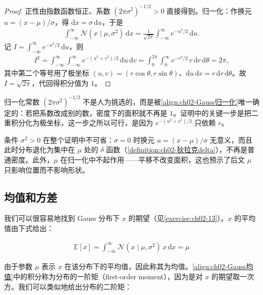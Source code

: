 \documentclass[../../main.tex]{subfiles}
\begin{document}
\begin{proof}
正性由指数函数恒正、系数 $(2\pi\sigma^{2})^{-1/2}>0$ 直接得到。归一化：作换元 $u=(x-\mu)/\sigma$，得 $\mathrm{d}x=\sigma\,\mathrm{d}u$，于是
\begin{align*}
 \int_{-\infty}^{\infty}\mathcal{N}(x\mid\mu,\sigma^{2})\,\mathrm{d}x
 = \frac{1}{\sqrt{2\pi}}\int_{-\infty}^{\infty}e^{-u^{2}/2}\,\mathrm{d}u .
\end{align*}
记 $I=\int_{-\infty}^{\infty}e^{-u^{2}/2}\,\mathrm{d}u$，则
\begin{align*}
 I^{2} = \int_{-\infty}^{\infty}\!\!\int_{-\infty}^{\infty} e^{-(u^{2}+v^{2})/2}\,\mathrm{d}u\,\mathrm{d}v
 = \int_{0}^{2\pi}\!\!\int_{0}^{\infty} e^{-r^{2}/2}\,r\,\mathrm{d}r\,\mathrm{d}\theta = 2\pi ,
\end{align*}
其中第二个等号用了极坐标 $(u,v)=(r\cos\theta,r\sin\theta)$、$\mathrm{d}u\,\mathrm{d}v=r\,\mathrm{d}r\,\mathrm{d}\theta$。故 $I=\sqrt{2\pi}$，代回得积分值为 $1$。
\end{proof}

\begin{remark}
归一化常数 $(2\pi\sigma^{2})^{-1/2}$ 不是人为挑选的，而是被\eqref{align:ch02-Gauss归一化}唯一确定的：若把系数改成别的数，密度下的面积就不再是 $1$。证明中的关键一步是把二重积分化为极坐标，这一步之所以可行，是因为 $e^{-(u^{2}+v^{2})/2}$ 只依赖 $r$。

条件 $\sigma^{2}>0$ 在整个证明中不可省：$\sigma=0$ 时换元 $u=(x-\mu)/\sigma$ 无意义，而且此时分布退化为集中在 $\mu$ 处的 $\delta$ 函数（\cref{definition:ch02-狄拉克delta}），不再是普通密度。此外，$\mu$ 在归一化中不起作用——平移不改变面积，这也预示了后文 $\mu$ 只影响位置而不影响形状。
\end{remark}

\subsection{均值和方差}\label{subsection:ch02-均值和方差}

我们可以很容易地找到 Gauss 分布下 $x$ 的期望（见\cref{exercise:ch02-13}）。$x$ 的平均值由下式给出：

\begin{align}
  \mathbb{E}[x] = \int_{-\infty}^{\infty}\mathcal{N}(x\mid\mu,\sigma^{2})\,x\,\mathrm{d}x = \mu
  \label{align:ch02-Gauss均值}
\end{align}

由于参数 $\mu$ 表示 $x$ 在该分布下的平均值，因此称其为均值。\eqref{align:ch02-Gauss均值}中的积分称为分布的一阶矩（first-order moment），因为是对 $x$ 的期望取一次方。我们可以类似地给出分布的二阶矩：
\end{document}
